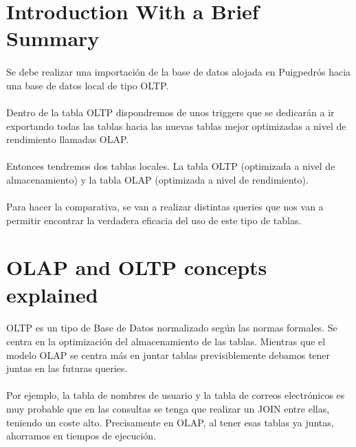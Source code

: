 \documentclass[a4paper 
,twoside
]{article}
\begin{document}


\newpage\thispagestyle{empty}
{
  \pagestyle{empty}
  \tableofcontents
  \clearpage
}

\section{Introduction With a Brief Summary}
  \paragraph{}
  Se debe realizar una importación de la base de datos alojada en Puigpedrós hacia una base de datos local de tipo OLTP.
  \paragraph{}
  Dentro de la tabla OLTP dispondremos de unos triggers que se dedicarán a ir exportando todas las tablas hacia las nuevas tablas mejor optimizadas a nivel de rendimiento llamadas OLAP.
  \paragraph{}
  Entonces tendremos dos tablas locales. La tabla OLTP (optimizada a nivel de almacenamiento) y la tabla OLAP (optimizada a nivel de rendimiento).
  \paragraph{}
  Para hacer la comparativa, se van a realizar distintas queries que nos van a permitir encontrar la verdadera eficacia del uso de este tipo de tablas.

\pagebreak
\section{OLAP and OLTP concepts explained}
  \paragraph{}
  OLTP es un tipo de Base de Datos normalizado según las normas formales. Se centra en la optimización del almacenamiento de las tablas. Mientras que el modelo OLAP se centra más en juntar tablas previsiblemente debamos tener juntas en las futuras queries. 
  \paragraph{}
  Por ejemplo, la tabla de nombres de usuario y la tabla de correos electrónicos es muy probable que en las consultas se tenga que realizar un JOIN entre ellas, teniendo un coste alto. Precisamente en OLAP, al tener esas tablas ya juntas, ahorramos en tiempos de ejecución.
\end{document}
